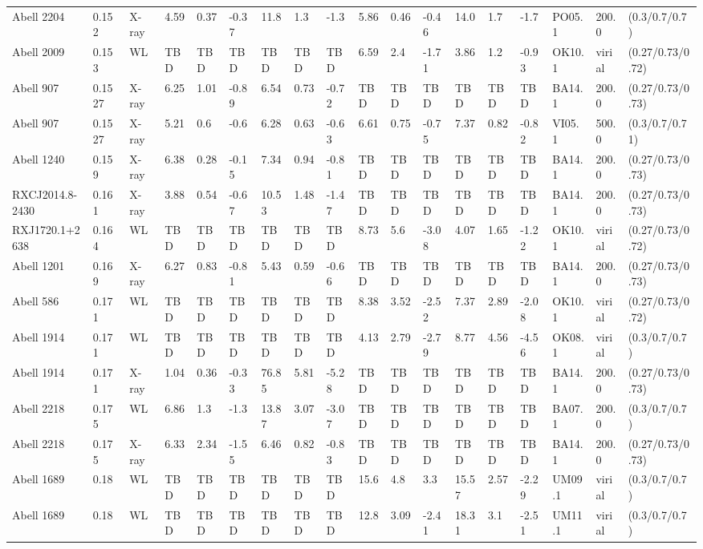 \documentclass{article}
\begin{document}
\begin{center}
\begin{landscape}
\begin{longtable}{llllllllllllllllll}
Abell 2204 & 0.152 & X-ray & 4.59 & 0.37 & -0.37 & 11.8 & 1.3 & -1.3 & 5.86 & 0.46 & -0.46 & 14.0 & 1.7 & -1.7 & PO05.1 & 200.0 & (0.3/0.7/0.7) \\
Abell 2009 & 0.153 & WL & TBD & TBD & TBD & TBD & TBD & TBD & 6.59 & 2.4 & -1.71 & 3.86 & 1.2 & -0.93 & OK10.1 & virial & (0.27/0.73/0.72) \\
Abell 907 & 0.1527 & X-ray & 6.25 & 1.01 & -0.89 & 6.54 & 0.73 & -0.72 & TBD & TBD & TBD & TBD & TBD & TBD & BA14.1 & 200.0 & (0.27/0.73/0.73) \\
Abell 907 & 0.1527 & X-ray & 5.21 & 0.6 & -0.6 & 6.28 & 0.63 & -0.63 & 6.61 & 0.75 & -0.75 & 7.37 & 0.82 & -0.82 & VI05.1 & 500.0 & (0.3/0.7/0.71) \\
Abell 1240 & 0.159 & X-ray & 6.38 & 0.28 & -0.15 & 7.34 & 0.94 & -0.81 & TBD & TBD & TBD & TBD & TBD & TBD & BA14.1 & 200.0 & (0.27/0.73/0.73) \\
RXCJ2014.8-2430 & 0.161 & X-ray & 3.88 & 0.54 & -0.67 & 10.53 & 1.48 & -1.47 & TBD & TBD & TBD & TBD & TBD & TBD & BA14.1 & 200.0 & (0.27/0.73/0.73) \\
RXJ1720.1+2638 & 0.164 & WL & TBD & TBD & TBD & TBD & TBD & TBD & 8.73 & 5.6 & -3.08 & 4.07 & 1.65 & -1.22 & OK10.1 & virial & (0.27/0.73/0.72) \\
Abell 1201 & 0.169 & X-ray & 6.27 & 0.83 & -0.81 & 5.43 & 0.59 & -0.66 & TBD & TBD & TBD & TBD & TBD & TBD & BA14.1 & 200.0 & (0.27/0.73/0.73) \\
Abell 586 & 0.171 & WL & TBD & TBD & TBD & TBD & TBD & TBD & 8.38 & 3.52 & -2.52 & 7.37 & 2.89 & -2.08 & OK10.1 & virial & (0.27/0.73/0.72) \\
Abell 1914 & 0.171 & WL & TBD & TBD & TBD & TBD & TBD & TBD & 4.13 & 2.79 & -2.79 & 8.77 & 4.56 & -4.56 & OK08.1 & virial & (0.3/0.7/0.7) \\
Abell 1914 & 0.171 & X-ray & 1.04 & 0.36 & -0.33 & 76.85 & 5.81 & -5.28 & TBD & TBD & TBD & TBD & TBD & TBD & BA14.1 & 200.0 & (0.27/0.73/0.73) \\
Abell 2218 & 0.175 & WL & 6.86 & 1.3 & -1.3 & 13.87 & 3.07 & -3.07 & TBD & TBD & TBD & TBD & TBD & TBD & BA07.1 & 200.0 & (0.3/0.7/0.7) \\
Abell 2218 & 0.175 & X-ray & 6.33 & 2.34 & -1.55 & 6.46 & 0.82 & -0.83 & TBD & TBD & TBD & TBD & TBD & TBD & BA14.1 & 200.0 & (0.27/0.73/0.73) \\
Abell 1689 & 0.18 & WL & TBD & TBD & TBD & TBD & TBD & TBD & 15.6 & 4.8 & 3.3 & 15.57 & 2.57 & -2.29 & UM09.1 & virial & (0.3/0.7/0.7) \\
Abell 1689 & 0.18 & WL & TBD & TBD & TBD & TBD & TBD & TBD & 12.8 & 3.09 & -2.41 & 18.31 & 3.1 & -2.51 & UM11.1 & virial & (0.3/0.7/0.7) \\

\end{longtable}
\end{landscape}
\end{center}
\end{document}
